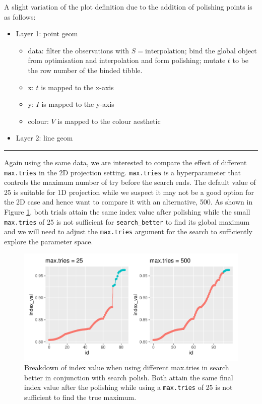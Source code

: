 \documentclass[12pt]{article}
\providecommand{\tightlist}{%
  \setlength{\itemsep}{0pt}\setlength{\parskip}{0pt}}
\begin{document}
A slight variation of the plot definition due to the addition of
polishing points is as follows:

\begin{itemize}
\tightlist
\item
  Layer 1: point geom

  \begin{itemize}
  \tightlist
  \item
    data: filter the observations with \(S = \text{interpolation}\);
    bind the global object from optimisation and interpolation and form
    polishing; mutate \(t\) to be the row number of the binded tibble.
  \item
    x: \(t\) is mapped to the x-axis
  \item
    y: \(I\) is mapped to the y-axis
  \item
    colour: \(V\) is mapped to the colour aesthetic
  \end{itemize}
\item
  Layer 2: line geom
\end{itemize}

\begin{center}\rule{0.5\linewidth}{0.5pt}\end{center}

Again using the same data, we are interested to compare the effect of
different \texttt{max.tries} in the 2D projection setting.
\texttt{max.tries} is a hyperparameter that controls the maximum number
of try before the search ends. The default value of 25 is suitable for
1D projection while we suspect it may not be a good option for the 2D
case and hence want to compare it with an alternative, 500. As shown in
Figure \ref{trace-compare}, both trials attain the same index value
after polishing while the small \texttt{max.tries} of 25 is not
sufficient for \texttt{search\_better} to find its global maximum and we
will need to adjust the \texttt{max.tries} argument for the search to
sufficiently explore the parameter space.

\begin{figure}
\centering
\includegraphics{paper_files/figure-latex/polish-1.pdf}
\caption{\label{trace-compare}Breakdown of index value when using
different max.tries in search better in conjunction with search polish.
Both attain the same final index value after the polishing while using a
\texttt{max.tries} of 25 is not sufficient to find the true maximum.}
\end{figure}
\end{document}
